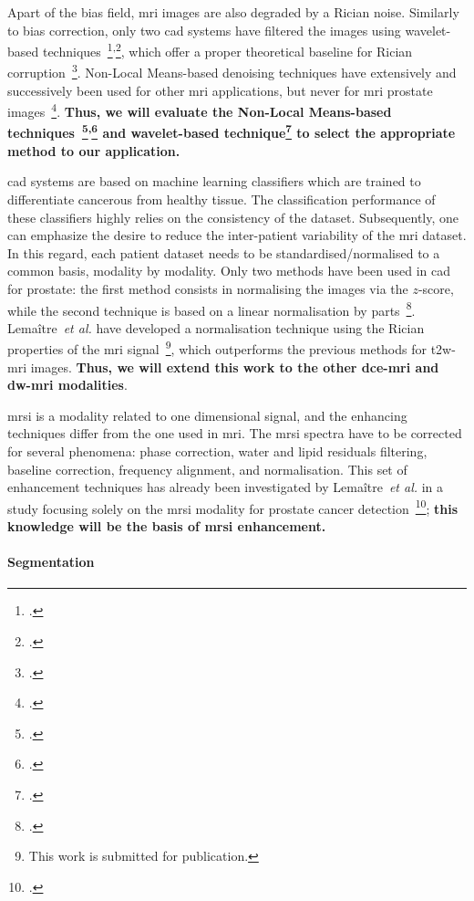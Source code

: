 Apart of the bias field, \Ac{mri} images are also degraded by a Rician noise. 
Similarly to bias correction, only two \ac{cad} systems have filtered the images using wavelet-based techniques~\footcite{Mallat2008}\textsuperscript{,}\footcite{Pizurica2003}, which offer a proper theoretical baseline for Rician corruption~\footcite{Nowak1999}.
Non-Local Means-based denoising techniques have extensively and successively been used for other \ac{mri} applications, but never for \ac{mri} prostate images~\footcite{Manjon2008}.
\textbf{Thus, we will evaluate the Non-Local Means-based techniques~\footcite{Manjon2012}\textsuperscript{,}\footcite{Coupe2011} and wavelet-based technique\footcite{Pizurica2003} to select the appropriate method to our application.}

\ac{cad} systems are based on machine learning classifiers which are trained to differentiate cancerous from healthy tissue.
The classification performance of these classifiers highly relies on the consistency of the dataset.
Subsequently, one can emphasize the desire to reduce the inter-patient variability of the \ac{mri} dataset.
In this regard, each patient dataset needs to be standardised/normalised to a common basis, modality by modality.
Only two methods have been used in \ac{cad} for prostate: the first method consists in normalising the images via the $z$-score, while the second technique is based on a linear normalisation by parts~\footcite{Madabhushi2006a}.
Lema\^itre~\emph{et al.} have developed a normalisation technique using the Rician properties of the \ac{mri} signal~\footnote{This work is submitted for publication.}, which outperforms the previous methods for \ac{t2w}-\ac{mri} images.
\textbf{Thus, we will extend this work to the other \ac{dce}-\ac{mri} and \ac{dw}-\ac{mri} modalities}.

\ac{mrsi} is a modality related to one dimensional signal, and the enhancing techniques differ from the one used in \ac{mri}.
The \ac{mrsi} spectra have to be corrected for several phenomena: phase correction, water and lipid residuals filtering, baseline correction, frequency alignment, and normalisation.
This set of enhancement techniques has already been investigated by Lema\^itre~\emph{et al.} in a study focusing solely on the \ac{mrsi} modality for prostate cancer detection~\footcite{Lemaitre2011}; \textbf{this knowledge will be the basis of \ac{mrsi} enhancement.}

\paragraph{Segmentation}

